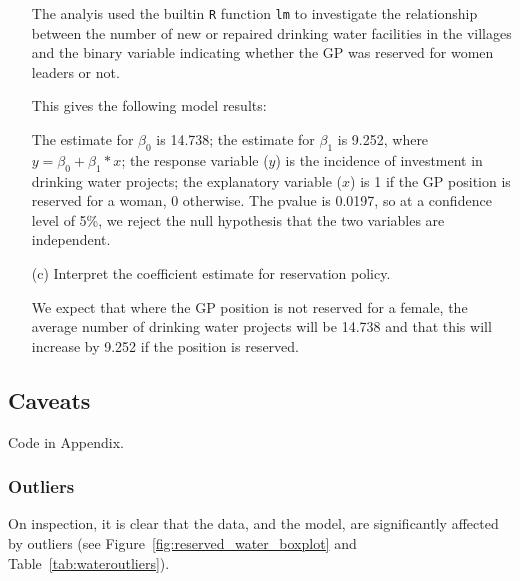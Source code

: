 \documentclass[12pt,letterpaper]{article}
\begin{document}
\begin{enumerate}
	
  The analyis used  the builtin \texttt{R} function \texttt{lm} to investigate the 
  relationship 	between the number of new or repaired drinking water facilities in 
  the villages and the binary variable indicating whether the GP was reserved for 
  women leaders or not.
  

	  

	This gives the following model results:
	
	

  The estimate for $\beta_0$ is 14.738; the estimate for $\beta_1$ is 9.252, where 
  $y = \beta_0 + \beta_1 * x $; the response variable ($y$) is the incidence of 
  investment in drinking water projects; the explanatory variable ($x$) is 1 if 
  the GP position is reserved for a woman, 0 otherwise.  The pvalue is 0.0197, so 
  at a confidence level of 5\%, we reject the null hypothesis that the two 
  variables are independent.


	\item [(c)] Interpret the coefficient estimate for reservation policy. 

  We expect that where the GP position is not reserved for a female, the average
  number of drinking water projects will be 14.738 and that this will increase by 
  9.252 if the position is reserved.
  
  \end{enumerate}
  
  \subsection*{Caveats}  
  
  Code in Appendix.
  
  \subsubsection*{Outliers}
	
	On inspection, it is clear that the data, and the model, are significantly affected
	by outliers (see Figure~\ref{fig:reserved_water_boxplot} and Table~\ref{tab:wateroutliers}).
	
\end{document}
